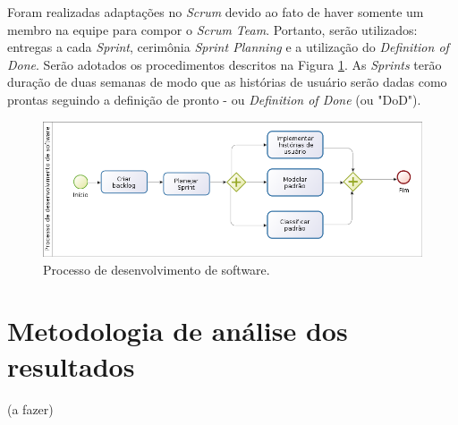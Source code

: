 Foram realizadas adaptações no \textit{Scrum} devido ao fato de haver somente um membro na equipe para compor o \textit{Scrum Team}. Portanto, serão utilizados: entregas a cada \textit{Sprint}, cerimônia \textit{Sprint Planning} e a utilização do \textit{Definition of Done}.
Serão adotados os procedimentos descritos na Figura \ref{fig:proc_desenv}. As \textit{Sprints} terão duração de duas semanas de modo que as histórias de usuário serão dadas como prontas seguindo a definição de pronto - ou \textit{Definition of Done} (ou "DoD"). 

\begin{figure}[!htb]
    \centering
    \includegraphics[scale=0.5]{figuras/processo_desenvolvimento.png}
    \caption{Processo de desenvolvimento de software.} 
    \label{fig:proc_desenv}
\end{figure}


\section{Metodologia de análise dos resultados}

(a fazer)




